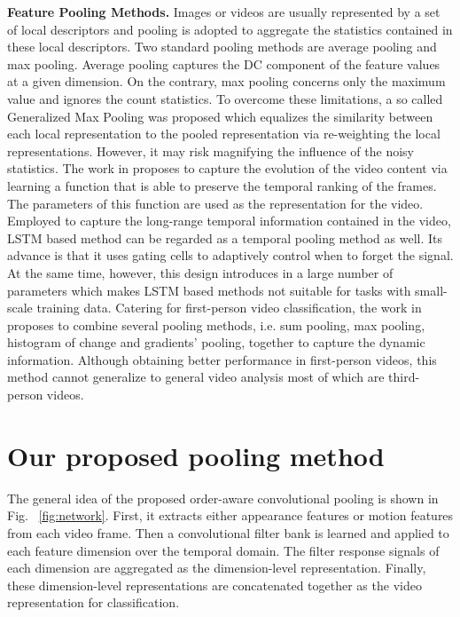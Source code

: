 \documentclass[journal]{IEEEtran}
\begin{document}
\noindent \textbf{Feature Pooling Methods.} Images or videos are usually represented by a set of local descriptors and pooling is adopted to aggregate the statistics contained in these local descriptors. Two standard pooling methods are average pooling and max pooling. Average pooling captures the DC component of the feature values at a given dimension.
On the contrary, max pooling concerns only the maximum value and ignores the count statistics.
To overcome these limitations, a so called Generalized Max Pooling \cite{Murray:2014:GMP} was proposed which equalizes the similarity between each local representation to the pooled representation via re-weighting the local representations. However, it may risk magnifying the influence of the noisy statistics.
The work in \cite{Fernando2015a} proposes to capture the evolution of the video content via learning a function that is able to preserve the temporal ranking of the frames. The parameters of this function are used as the representation for the video. Employed to capture the long-range temporal information contained in the video, LSTM based method can be regarded as a temporal pooling method as well. Its advance is that it uses gating cells to adaptively control when to forget the signal. At the same time, however, this design introduces in a large number of parameters which makes LSTM based methods not suitable for tasks with small-scale training data. Catering for first-person video classification, the work in \cite{Ryoo_2015_CVPR} proposes to combine several pooling methods, i.e. sum pooling, max pooling, histogram of change and gradients' pooling, together to capture the dynamic information. Although obtaining better performance in first-person videos, this method cannot generalize to general video analysis most of which are third-person videos.




\section{Our proposed pooling method}
\label{our approach}
The general idea of the proposed order-aware convolutional pooling is shown in Fig.~ \ref{fig:network}. First, it extracts either appearance features or motion features from each video frame. Then a convolutional filter bank is learned and applied to each feature dimension over the temporal domain. The filter response signals of each dimension are aggregated as the dimension-level representation. Finally, these dimension-level representations are concatenated together as the video representation for classification.
\end{document}

